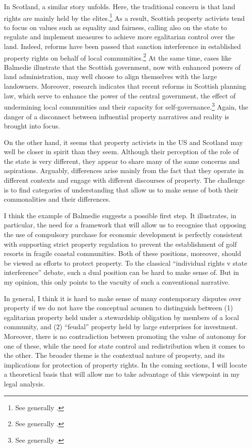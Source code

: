 In Scotland, a similar story unfolds. Here, the traditional concern is that land rights are mainly held by the elites.\footnote{See generally \cite{wightman96,wightman13}.} As a result, Scottish property activists tend to focus on values such as equality and fairness, calling also on the state to regulate and implement measures to achieve more egalitarian control over the land. Indeed, reforms have been passed that sanction interference in established property rights on behalf of local communities.\footnote{See generally \cite{lovett11,hoffman13}.} At the same time, cases like Balmedie illustrate that the Scottish government, now with enhanced powers of land administration, may well choose to align themselves with the large landowners. Moreover, research indicates that recent reforms in Scottish planning law, which serve to enhance the power of the central government,  the effect of undermining local communities and their capacity for self-governance.\footnote{See generally \cite{pacione13,pacione14}.} Again, the danger of a disconnect between influential property narratives and reality is brought into focus.

On the other hand, it seems that  property activists in the US and Scotland may well be closer in spirit than they seem. Although their perception of the role of the state is very different, they appear to share many of the same concerns and aspirations. Arguably, differences arise mainly from the fact that they operate in different contexts and engage with different discourses of property. The challenge is to find categories of understanding that allow us to make sense of both their commonalities and their differences.

I think the example of Balmedie suggests a possible first step. It illustrates, in particular, the need for a framework that will allow us to recognise that opposing the use of compulsory purchase for economic development is perfectly consistent with supporting strict property regulation to prevent the establishment of golf resorts in fragile coastal communities. Both of these positions, moreover, should be viewed as efforts to protect property. To the classical ``individual rights v state interference'' debate, such a dual position can be hard to make sense of. But in my opinion, this only points to the vacuity of such a conventional narrative.

In general, I think it is hard to make sense of many contemporary disputes over property if we do not have the conceptual acumen to distinguish between (1) egalitarian property held under a stewardship obligation by members of a local community, and (2) ``feudal'' property held by large enterprises for investment. Moreover, there is no contradiction between promoting the value of autonomy for one of these, while  the need for state control and redistribution when it comes to the other. The broader theme is the contextual nature of property, and its implications for protection of property rights. In the coming sections, I will locate a theoretical basis that will allow me to take advantage of this viewpoint in my legal analysis.

